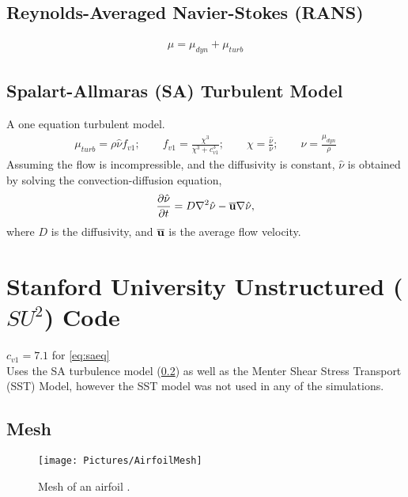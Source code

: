 \documentclass[10pt, titlepage]{article}
\begin{document}
\subsection{Reynolds-Averaged Navier-Stokes (RANS)}

\begin{align*}
\mu = \mu_{dyn} + \mu_{turb}
\end{align*}

\subsection{Spalart-Allmaras (SA) Turbulent Model}\label{subsec:saturb}
A one equation turbulent model.
\begin{align}
\mu_{turb} = \rho \hat{\nu} f_{v1}; \qquad f_{v1} = \frac{\chi^3}{\chi^3+c_{v1}^3}; \qquad \chi = \frac{\hat{\nu}}{\nu}; \qquad \nu = \frac{\mu_{dyn}}{\rho}
\label{eq:saeq}
\end{align}
Assuming the flow is incompressible, and the diffusivity is constant, $\hat{\nu}$ is obtained by solving the convection-diffusion equation,
\begin{align}
\frac{\partial \hat{\nu}}{\partial t} = D \nabla^2 \hat{\nu} - \overline{\bf{u}} \nabla \hat{\nu},
\end{align}
where $D$ is the diffusivity, and $\overline{\bf{u}}$ is the average flow velocity.

\section{Stanford University Unstructured ($SU^2$) Code}
$c_{v1} = 7.1$ for \eqref{eq:saeq} \\

Uses the SA turbulence model (\ref{subsec:saturb}) as well as the Menter Shear Stress Transport (SST) Model, however the SST model was not used in any of the simulations.

\lipsum[1-2]

\subsection{Mesh}

\begin{wrapfigure}{R}{0.5\textwidth}
\centering
\texttt{[image: Pictures/AirfoilMesh]}
\caption[Mesh of an Airfoil]{Mesh of an airfoil \cite{mesh}.}
\label{fig:airfoilmesh}
\end{wrapfigure}

\lipsum[1-2]
\end{document}
